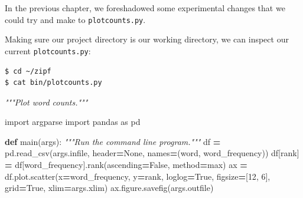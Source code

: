 \documentclass[
]{krantz}
\makeatletter
\newenvironment{Shaded}{\begin{snugshade}}{\end{snugshade}}
\newcommand{\CommentTok}[1]{\textcolor[rgb]{0.56,0.35,0.01}{\textit{#1}}}
\newcommand{\DecValTok}[1]{\textcolor[rgb]{0.00,0.00,0.81}{#1}}
\newcommand{\ImportTok}[1]{#1}
\newcommand{\KeywordTok}[1]{\textcolor[rgb]{0.13,0.29,0.53}{\textbf{#1}}}
\newcommand{\NormalTok}[1]{#1}
\newcommand{\OperatorTok}[1]{\textcolor[rgb]{0.81,0.36,0.00}{\textbf{#1}}}
\newcommand{\StringTok}[1]{\textcolor[rgb]{0.31,0.60,0.02}{#1}}
\newcommand{\VariableTok}[1]{\textcolor[rgb]{0.00,0.00,0.00}{#1}}
\newenvironment{kframe}{%
\medskip{}
\setlength{\fboxsep}{.8em}
 \def\at@end@of@kframe{}%
 \ifinner\ifhmode%
  \def\at@end@of@kframe{\end{minipage}}%
  \begin{minipage}{\columnwidth}%
 \fi\fi%
 \def\FrameCommand##1{\hskip\@totalleftmargin \hskip-\fboxsep
 \colorbox{shadecolor}{##1}\hskip-\fboxsep
     \hskip-\linewidth \hskip-\@totalleftmargin \hskip\columnwidth}%
 \MakeFramed {\advance\hsize-\width
   \@totalleftmargin\z@ \linewidth\hsize
   \@setminipage}}%
 {\par\unskip\endMakeFramed%
 \at@end@of@kframe}
\renewenvironment{Shaded}{\begin{kframe}}{\end{kframe}}
\makeatother
\begin{document}
In the previous chapter,
we foreshadowed some experimental changes that we could try and make to \texttt{plotcounts.py}.

Making sure our project directory is our working directory,
we can inspect our current \texttt{plotcounts.py}:

\begin{verbatim}
$ cd ~/zipf
$ cat bin/plotcounts.py
\end{verbatim}

\begin{Shaded}
\begin{Highlighting}[]
\CommentTok{"""Plot word counts."""}

\ImportTok{import}\NormalTok{ argparse}
\ImportTok{import}\NormalTok{ pandas }\ImportTok{as}\NormalTok{ pd}


\KeywordTok{def}\NormalTok{ main(args):}
    \CommentTok{"""Run the command line program."""}
\NormalTok{    df }\OperatorTok{=}\NormalTok{ pd.read\_csv(args.infile, header}\OperatorTok{=}\VariableTok{None}\NormalTok{, names}\OperatorTok{=}\NormalTok{(}\StringTok{\textquotesingle{}word\textquotesingle{}}\NormalTok{, }\StringTok{\textquotesingle{}word\_frequency\textquotesingle{}}\NormalTok{))}
\NormalTok{    df[}\StringTok{\textquotesingle{}rank\textquotesingle{}}\NormalTok{] }\OperatorTok{=}\NormalTok{ df[}\StringTok{\textquotesingle{}word\_frequency\textquotesingle{}}\NormalTok{].rank(ascending}\OperatorTok{=}\VariableTok{False}\NormalTok{, method}\OperatorTok{=}\StringTok{\textquotesingle{}max\textquotesingle{}}\NormalTok{)}
\NormalTok{    ax }\OperatorTok{=}\NormalTok{ df.plot.scatter(x}\OperatorTok{=}\StringTok{\textquotesingle{}word\_frequency\textquotesingle{}}\NormalTok{, y}\OperatorTok{=}\StringTok{\textquotesingle{}rank\textquotesingle{}}\NormalTok{, loglog}\OperatorTok{=}\VariableTok{True}\NormalTok{,}
\NormalTok{                         figsize}\OperatorTok{=}\NormalTok{[}\DecValTok{12}\NormalTok{, }\DecValTok{6}\NormalTok{], grid}\OperatorTok{=}\VariableTok{True}\NormalTok{, xlim}\OperatorTok{=}\NormalTok{args.xlim)}
\NormalTok{    ax.figure.savefig(args.outfile)}



\end{Highlighting}
\end{Shaded}
\end{document}
